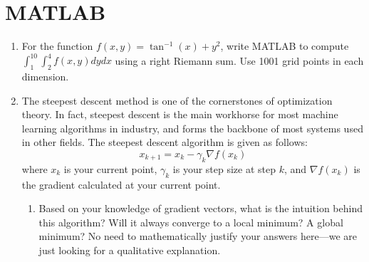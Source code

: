 \documentclass[letterpaper, 11pt]{article}
\begin{document}
\section{MATLAB}
\begin{enumerate}
\item For the function $f(x,y) = \tan^{-1}(x) + y^2$, write MATLAB to compute $\int_1^{10} \int_2^4 f(x,y)dydx$ using a right Riemann sum. Use 1001 grid points in each dimension. 

%
%
%
%
%
%
%
%


\item The steepest descent method is one of the cornerstones of optimization theory. In fact, steepest descent is the main workhorse for most machine learning algorithms in industry, and forms the backbone of most systems used in other fields. The steepest descent algorithm is given as follows:
\[ x_{k+1} = x_k - \gamma_k \nabla f(x_k)\]
where $x_k$ is your current point, $\gamma_k$ is your step size at step $k$, and $\nabla f(x_k)$ is the gradient calculated at your current point.
\begin{enumerate}[label=(\alph*)]
\item Based on your knowledge of gradient vectors, what is the intuition behind this algorithm? Will it always converge to a local minimum? A global minimum? No need to mathematically justify your answers here---we are just looking for a qualitative explanation. 


\end{enumerate}
\end{enumerate}
\end{document}
